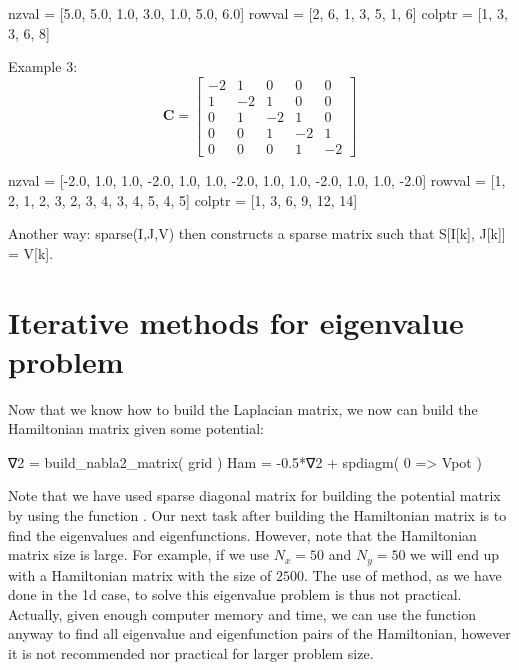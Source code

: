 \begin{textcode}
nzval  = [5.0, 5.0, 1.0, 3.0, 1.0, 5.0, 6.0]
rowval = [2, 6, 1, 3, 5, 1, 6]
colptr = [1, 3, 3, 6, 8]
\end{textcode}

Example 3:
\begin{equation}
\mathbf{C} = \begin{bmatrix}
 -2  &  1  &  0  &  0  &  0 \\
  1  & -2  &  1  &  0  &  0 \\
  0  &  1  & -2  &  1  &  0 \\
  0  &  0  &  1  & -2  &  1 \\
  0  &  0  &  0  &  1  & -2
\end{bmatrix}
\end{equation}

\begin{textcode}
nzval  = [-2.0, 1.0, 1.0, -2.0, 1.0, 1.0, -2.0, 1.0, 1.0, -2.0, 1.0, 1.0, -2.0]
rowval = [1, 2, 1, 2, 3, 2, 3, 4, 3, 4, 5, 4, 5]
colptr = [1, 3, 6, 9, 12, 14]
\end{textcode}

Another way:
sparse(I,J,V) then constructs a sparse matrix such that S[I[k], J[k]] = V[k].

\section{Iterative methods for eigenvalue problem}

Now that we know how to build the Laplacian matrix, we now can build the Hamiltonian
matrix given some potential:
\begin{juliacode}
∇2 = build_nabla2_matrix( grid )
Ham = -0.5*∇2 + spdiagm( 0 => Vpot )
\end{juliacode}
Note that we have used sparse diagonal matrix for building the potential matrix by
using the function .
Our next task after building the Hamiltonian matrix is to find the eigenvalues
and eigenfunctions.
However, note that the Hamiltonian matrix size is large.
For example, if we use $N_x=50$ and $N_y=50$ we will end up with a Hamiltonian
matrix with the size of $2500$.
The use of  method, as we have done in the 1d case,
to solve this eigenvalue problem is thus not practical.
Actually, given enough computer memory and time, we can use the function
 anyway to find all eigenvalue and eigenfunction pairs of
the Hamiltonian, however it is not recommended
nor practical for larger problem size.

